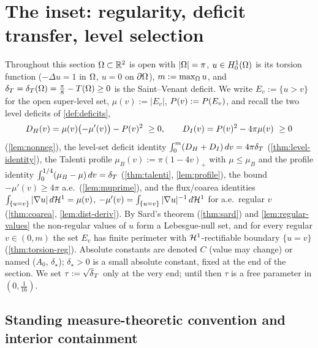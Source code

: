 \section{The inset: regularity, deficit transfer, level selection}
\label{sec:inset}

Throughout this section $\Omega\subset\mathbb{R}^2$ is open with $|\Omega|=\pi$, $u\in
H^1_0(\Omega)$ is its torsion function ($-\Delta u=1$ in $\Omega$, $u=0$ on
$\partial\Omega$), $m:=\max_\Omega u$, and $\delta_T=\delta_T(\Omega)=\tfrac\pi8-T(\Omega)\ge0$ is
the Saint--Venant deficit. We write $E_v:=\{u>v\}$ for the open super-level
set, $\mu(v):=|E_v|$, $P(v):=P(E_v)$, and recall the two level
deficits of \cref{def:deficits},
\[
   D_H(v)=\mu(v)\bigl(-\mu'(v)\bigr)-\Per(v)^2\ \ge0,
   \qquad
   D_I(v)=\Per(v)^2-4\pi\mu(v)\ \ge0
\]
(\cref{lem:nonneg}), the level-set deficit identity
$\int_0^m(D_H+D_I)\,dv=4\pi\delta_T$ (\cref{thm:level-identity}), the Talenti
profile $\mu_B(v):=\pi(1-4v)_+$ with $\mu\le\mu_B$ and the profile identity
$\int_0^{1/4}(\mu_B-\mu)\,dv=\delta_T$ (\cref{thm:talenti}, \cref{lem:profile}),
the bound $-\mu'(v)\ge4\pi$ a.e.\ (\cref{lem:muprime}), and the flux/coarea
identities $\int_{\{u=v\}}|\nabla u|\,d\mathcal{H}^1=\mu(v)$,
$-\mu'(v)=\int_{\{u=v\}}|\nabla u|^{-1}\,d\mathcal{H}^1$ for a.e.\ regular $v$
(\cref{thm:coarea}, \cref{lem:dist-deriv}). By Sard's theorem
(\cref{thm:sard}) and \cref{lem:regular-values} the non-regular values of
$u$ form a Lebesgue-null set, and for every regular $v\in(0,m)$ the set
$E_v$ has finite perimeter with $\mathcal{H}^1$-rectifiable boundary
$\{u=v\}$ (\cref{thm:torsion-reg}). Absolute constants are denoted $C$ (value
may change) or named ($A_0$, $\delta_\star$); $\delta_\star>0$ is a small
absolute constant, fixed at the end of the section. We set $\tau:=\sqrt\dT$
only at the very end; until then $\tau$ is a free parameter in $(0,\tfrac1{16})$.

\subsection{Standing measure-theoretic convention and interior containment}
\label{ss:containment}

